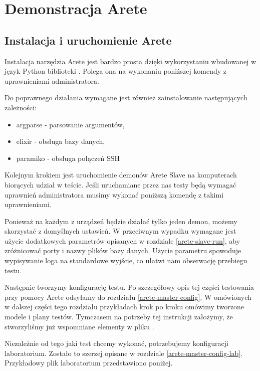 \documentclass[00-praca-magisterska.tex]{subfiles}
\begin{document}
\chapter{Demonstracja Arete}
\label{demonstracja-arete}

\section{Instalacja i uruchomienie Arete}

Instalacja narzędzia Arete jest bardzo prosta dzięki wykorzystaniu wbudowanej w
język Python biblioteki  \cite{distutils}. Polega ona na
wykonaniu poniższej komendy z uprawnieniami administratora.


Do poprawnego działania wymagane jest również zainstalowanie następujących
zależności:

\begin{itemize}
\item{argparse \cite{argparse} - parsowanie argumentów,}
\item{elixir \cite{elixir} - obsługa bazy danych,}
\item{paramiko \cite{paramiko} - obsługa połączeń SSH}
\end{itemize}

Kolejnym krokiem jest uruchomienie demonów Arete Slave na komputerach biorących
udział w teście. Jeśli uruchamiane przez nas testy będą wymagać uprawnień
administratora musimy wykonać poniższą komendę z takimi uprawnieniami.


Ponieważ na każdym z urządzeń będzie działać tylko jeden demon, możemy
skorzystać z domyślnych ustawień. W przeciwnym wypadku wymagane jest użycie
dodatkowych parametrów opisanych w rozdziale \ref{arete-slave-run}, aby
zróżnicować porty i nazwy plików bazy danych. Użycie parametru 
spowoduje wypisywanie loga na standardowe wyjście, co ułatwi nam obserwację
przebiegu testu. 

Następnie tworzymy konfigurację testu. Po szczegółowy opis tej części
testowania przy pomocy Arete odsyłamy do rozdziału \ref{arete-master-config}.
W omówionych w dalszej części tego rozdziału przykładach krok po kroku omówimy
tworzone modele i plany testów. Tymczasem na potrzeby tej instrukcji założymy,
że stworzyliśmy już wspomniane elementy w pliku .

Niezależnie od tego jaki test chcemy wykonać, potrzebujemy konfiguracji
laboratorium. Zostało to szerzej opisane w rozdziale
\ref{arete-master-config-lab}. Przykładowy plik laboratorium przedstawiono
poniżej. 
\end{document}
